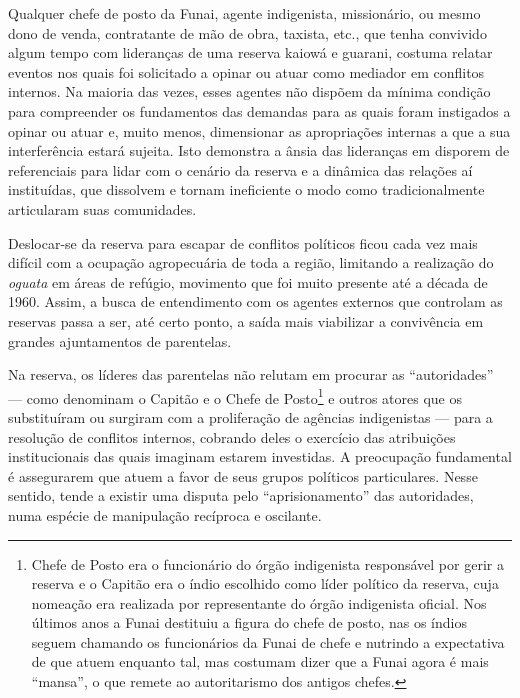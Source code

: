 Qualquer chefe de posto da Funai, agente indigenista, missionário, ou
mesmo dono de venda, contratante de mão de obra, taxista, etc., que
tenha convivido algum tempo com lideranças de uma reserva kaiowá e
guarani, costuma relatar eventos nos quais foi solicitado a opinar ou
atuar como mediador em conflitos internos. Na maioria das vezes, esses
agentes não dispõem da mínima condição para compreender os fundamentos
das demandas para as quais foram instigados a opinar ou atuar e, muito
menos, dimensionar as apropriações internas a que a sua interferência
estará sujeita. Isto demonstra a ânsia das lideranças em disporem de
referenciais para lidar com o cenário da reserva e a dinâmica das
relações aí instituídas, que dissolvem e tornam ineficiente o modo como
tradicionalmente articularam suas comunidades.

Deslocar-se da reserva para escapar de conflitos políticos ficou cada
vez mais difícil com a ocupação agropecuária de toda a região, limitando
a realização do \emph{oguata} em áreas de refúgio, movimento que foi
muito presente até a década de 1960. Assim, a busca de entendimento com
os agentes externos que controlam as reservas passa a ser, até certo
ponto, a saída mais viabilizar a convivência em grandes ajuntamentos de
parentelas.

Na reserva, os líderes das parentelas não relutam em procurar as
``autoridades'' --- como denominam o Capitão e o Chefe de
Posto\footnote{Chefe de Posto era o funcionário do órgão indigenista
  responsável por gerir a reserva e o Capitão era o índio escolhido como
  líder político da reserva, cuja nomeação era realizada por
  representante do órgão indigenista oficial. Nos últimos anos a Funai
  destituiu a figura do chefe de posto, nas os índios seguem chamando os
  funcionários da Funai de chefe e nutrindo a expectativa de que atuem
  enquanto tal, mas costumam dizer que a Funai agora é mais ``mansa'', o
  que remete ao autoritarismo dos antigos chefes.} e outros atores que
os substituíram ou surgiram com a proliferação de agências indigenistas
--- para a resolução de conflitos internos, cobrando deles o exercício
das atribuições institucionais das quais imaginam estarem investidas. A
preocupação fundamental é assegurarem que atuem a favor de seus grupos
políticos particulares. Nesse sentido, tende a existir uma disputa pelo
``aprisionamento'' das autoridades, numa espécie de manipulação
recíproca e oscilante.

